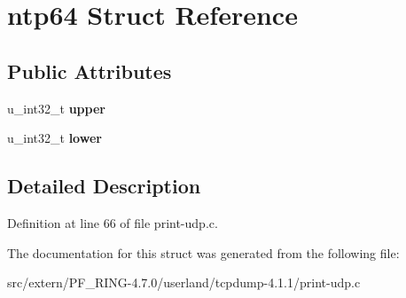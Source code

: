 \hypertarget{structntp64}{
\section{ntp64 Struct Reference}
\label{structntp64}
}
\subsection*{Public Attributes}
\begin{DoxyCompactItemize}
\item 
\hypertarget{structntp64_a6960909fb9d06bb910d0c1403bce8d18}{
u\_\-int32\_\-t {\bfseries upper}}
\label{structntp64_a6960909fb9d06bb910d0c1403bce8d18}

\item 
\hypertarget{structntp64_a8e981e8e24bb2c4e3b459bdf56c3dfe4}{
u\_\-int32\_\-t {\bfseries lower}}
\label{structntp64_a8e981e8e24bb2c4e3b459bdf56c3dfe4}

\end{DoxyCompactItemize}


\subsection{Detailed Description}


Definition at line 66 of file print-\/udp.c.



The documentation for this struct was generated from the following file:\begin{DoxyCompactItemize}
\item 
src/extern/PF\_\-RING-\/4.7.0/userland/tcpdump-\/4.1.1/print-\/udp.c\end{DoxyCompactItemize}
